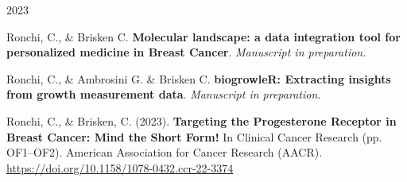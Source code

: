 

\begin{cventries}

\cventry
  {}
  {2023} %
  {}{}
  {
    \begin{cvitems} %
      \item {Ronchi, C., \& Brisken C. \textbf{Molecular landscape: a data integration tool for 
             personalized medicine in Breast Cancer}. \textit{Manuscript in preparation.}}
      \item {Ronchi, C., \& Ambrosini G. \& Brisken C. \textbf{biogrowleR: Extracting insights 
             from growth measurement data}. \textit{Manuscript in preparation.}}
      \item {Ronchi, C., \& Brisken, C. (2023). \textbf{Targeting the Progesterone Receptor 
             in Breast Cancer: Mind the Short Form!} In Clinical Cancer Research
             (pp. OF1–OF2). American Association for Cancer Research (AACR). 
             \url{https://doi.org/10.1158/1078-0432.ccr-22-3374}}
    \end{cvitems}
  }

\end{cventries}

